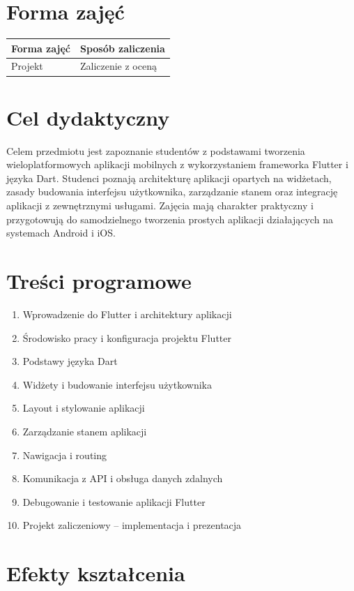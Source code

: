 \documentclass[12pt, a4paper]{article}
\begin{document}
\section{Forma zajęć}

\begin{tabular}{ll}
  \hline
  \textbf{Forma zajęć} & \textbf{Sposób zaliczenia} \\
  \hline
  Projekt & Zaliczenie z oceną \\
  \hline
\end{tabular}

\section{Cel dydaktyczny}

Celem przedmiotu jest zapoznanie studentów z podstawami tworzenia wieloplatformowych aplikacji mobilnych z wykorzystaniem frameworka Flutter i języka Dart. Studenci poznają architekturę aplikacji opartych na widżetach, zasady budowania interfejsu użytkownika, zarządzanie stanem oraz integrację aplikacji z zewnętrznymi usługami. Zajęcia mają charakter praktyczny i przygotowują do samodzielnego tworzenia prostych aplikacji działających na systemach Android i iOS.

\section{Treści programowe}

\begin{enumerate}
  \item Wprowadzenie do Flutter i architektury aplikacji
  \item Środowisko pracy i konfiguracja projektu Flutter
  \item Podstawy języka Dart
  \item Widżety i budowanie interfejsu użytkownika
  \item Layout i stylowanie aplikacji
  \item Zarządzanie stanem aplikacji
  \item Nawigacja i routing
  \item Komunikacja z API i obsługa danych zdalnych
  \item Debugowanie i testowanie aplikacji Flutter
  \item Projekt zaliczeniowy – implementacja i prezentacja
\end{enumerate}

\section{Efekty kształcenia}
\end{document}
